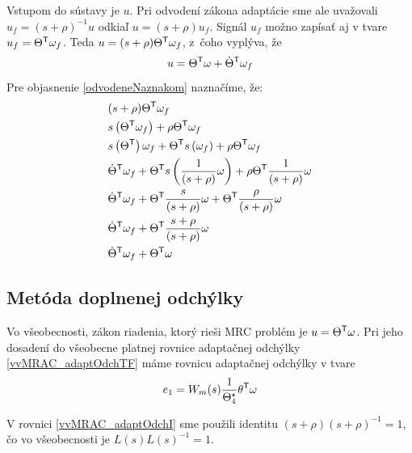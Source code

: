﻿\documentclass[a4paper, 10pt, ]{article}
\begin{document}
Vstupom do sústavy je $u$. Pri odvodení zákona adaptácie sme ale uvažovali $u_f = (s + \rho)^{-1} u$ odkiaľ $u = (s + \rho)u_f$. Signál $u_f$ možno zapísať aj v tvare $u_f = \Theta^{\mathsf{T}} \omega_f$. Teda $u = (s + \rho) \Theta^{\mathsf{T}} \omega_f$, z~čoho vyplýva, že
\begin{equation} \label{odvodeneNaznakom}
	u = \Theta^{\mathsf{T}} \omega  +  \dot{\Theta}^{\mathsf{T}} \omega_f
\end{equation}
Pre objasnenie \eqref{odvodeneNaznakom} naznačíme, že:
\begin{align*}
	&	(s + \rho) \Theta^{\mathsf{T}} \omega_f \\
	&	s \left( \Theta^{\mathsf{T}} \omega_f \right) + \rho \Theta^{\mathsf{T}} \omega_f \\
	&	s \left( \Theta^{\mathsf{T}} \right) \omega_f + \Theta^{\mathsf{T}} s \left( \omega_f \right) + \rho \Theta^{\mathsf{T}} \omega_f \\
	&	\dot{\Theta}^{\mathsf{T}} \omega_f + \Theta^{\mathsf{T}} s \left( \frac{1}{(s + \rho)} \omega \right) + \rho \Theta^{\mathsf{T}} \frac{1}{(s + \rho)} \omega \\
	&	\dot{\Theta}^{\mathsf{T}} \omega_f + \Theta^{\mathsf{T}} \frac{s}{(s + \rho)} \omega + \Theta^{\mathsf{T}} \frac{\rho}{(s + \rho)} \omega \\
	&	\dot{\Theta}^{\mathsf{T}} \omega_f + \Theta^{\mathsf{T}} \frac{s + \rho}{(s + \rho)} \omega \\
	&	\dot{\Theta}^{\mathsf{T}} \omega_f + \Theta^{\mathsf{T}} \omega
\end{align*}









\subsection{Metóda doplnenej odchýlky}



Vo všeobecnosti, zákon riadenia, ktorý rieši MRC problém je $u = \Theta^{\mathsf{T}} \omega$. Pri jeho dosadení do všeobecne platnej rovnice adaptačnej odchýlky  \eqref{vvMRAC_adaptOdchTF}  máme rovnicu adaptačnej odchýlky v tvare
\begin{equation} \label{vvMRAC_adaptOdchTF_vseob}
	e_1 = W_m(s) \frac{1}{\Theta_4^\star} \theta^{\mathsf{T}} \omega
\end{equation}

V rovnici \eqref{vvMRAC_adaptOdchI} sme použili identitu $(s+\rho)(s+\rho)^{-1} = 1$, čo vo všeobecnosti je $L(s)L(s)^{-1} = 1$.
\end{document}
